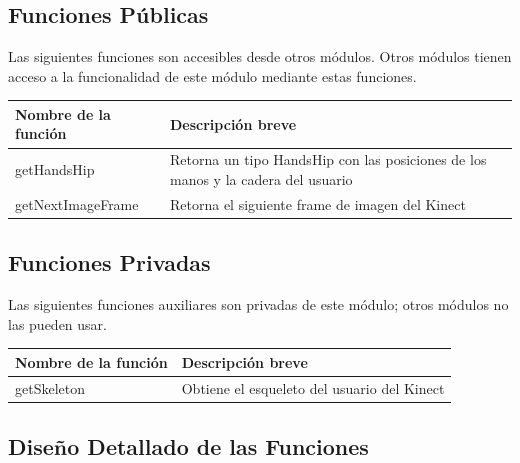\documentclass[a4paper,10pt]{article}
\begin{document}
\subsection{Funciones Públicas}
Las siguientes funciones son accesibles desde otros módulos. Otros módulos
tienen acceso a la funcionalidad de este módulo mediante estas funciones.
~\\

\begin{tabular}{| p{30mm} | p{10cm} |}
        \hline
        \textbf{Nombre de la \mbox{función}} & \textbf{Descripción breve} \\
        \hline
        getHandsHip & Retorna un tipo HandsHip con las posiciones de los manos y
        la cadera del usuario \\
        \hline
        getNextImageFrame & Retorna el siguiente frame de imagen del Kinect \\
        \hline
\end{tabular}
\subsection{Funciones Privadas}
Las siguientes funciones auxiliares son privadas de este módulo; otros módulos
no las pueden usar.~\\

\begin{tabular}{| p{30mm} | p{10cm} |}
        \hline
        \textbf{Nombre de la \mbox{función}} & \textbf{Descripción breve} \\
        \hline
        getSkeleton & Obtiene el esqueleto del usuario del Kinect \\
        \hline
\end{tabular}
\subsection{Diseño Detallado de las Funciones}
\end{document}
